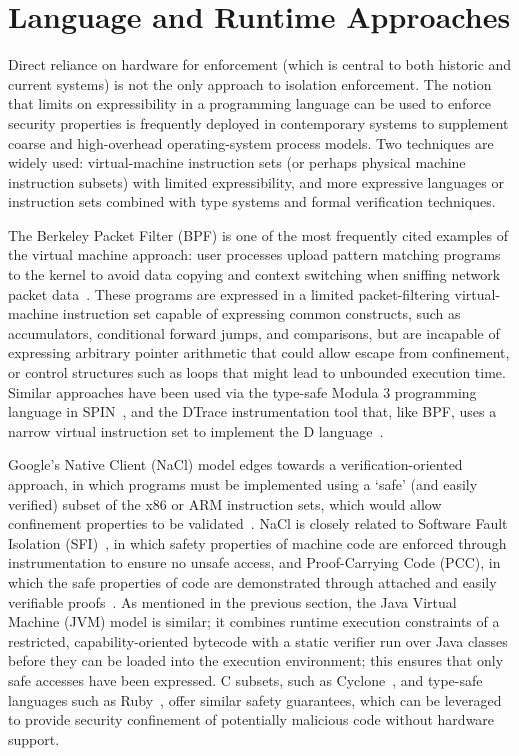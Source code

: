 \section{Language and Runtime Approaches} %

Direct reliance on hardware for enforcement (which is central to both historic 
and current systems) is not the only approach to isolation enforcement.
The notion that limits on expressibility in a programming language can be used to
enforce security properties is frequently deployed in contemporary systems to
supplement coarse and high-overhead operating-system process models.
Two techniques are widely used: virtual-machine instruction sets (or perhaps physical
machine instruction subsets) with limited expressibility, and more expressive languages
or instruction sets combined with type systems and formal verification techniques.

The Berkeley Packet Filter (BPF) is one of the most frequently cited
examples of the virtual machine approach: user processes upload pattern matching programs
to the kernel to avoid data copying and context switching when sniffing network packet
data~\cite{mccanne:bpf}.
These programs are expressed in a limited packet-filtering virtual-machine instruction
set capable of expressing common constructs, such as accumulators, conditional forward
jumps, and comparisons, but are incapable of expressing arbitrary pointer arithmetic that
could allow escape from confinement, or control structures such as loops that might lead
to unbounded execution time.
Similar approaches have been used via the type-safe Modula 3 programming language in
SPIN~\cite{bershad:spin}, and the DTrace instrumentation tool that, like BPF, uses a narrow
virtual instruction set to implement the D language~\cite{cantrill:dtrace}.

Google's Native Client (NaCl) model edges towards a verification-oriented approach, in which
programs must be implemented using a `safe' (and easily verified) subset of the x86 or ARM
instruction sets, which would allow confinement properties to be validated~\cite{yee:nativeclient}.
NaCl is closely related to Software Fault Isolation (SFI)~\cite{wahbe:sfi}, in which safety
properties of machine code are enforced through instrumentation to ensure no unsafe access,
and Proof-Carrying Code (PCC), in which the safe properties of code are demonstrated through
attached and easily verifiable proofs~\cite{necula:pcc}.
As mentioned in the previous section, the 
Java Virtual Machine (JVM) model is similar; 
it combines runtime execution constraints of a
restricted, capability-oriented bytecode with a static verifier run over
Java classes before they can be loaded into the execution environment; this
 ensures that only safe accesses have been expressed.
C subsets, such as Cyclone~\cite{trevor:cyclone}, and type-safe languages such as
Ruby~\cite{ruby}, offer similar safety guarantees, which can be leveraged to provide
security confinement of potentially malicious code without hardware support.

